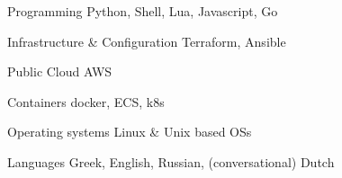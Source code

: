 


\begin{cvskills}


\cvskill
{Programming} %
{Python, Shell, Lua, Javascript, Go} %


\cvskill
{Infrastructure \& Configuration} %
{Terraform, Ansible} %


\cvskill
{Public Cloud} %
{AWS} %


\cvskill
{Containers} %
{docker, ECS, k8s} %




\cvskill
{Operating systems} %
{Linux \& Unix based OSs} %




\cvskill
{Languages} %
{Greek, English, Russian, (conversational) Dutch} %

\end{cvskills}
